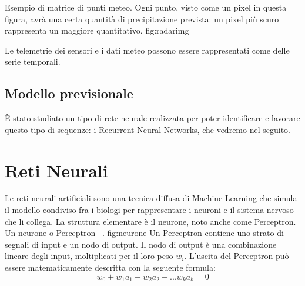 {Esempio di matrice di punti meteo. Ogni punto, visto come un pixel in questa figura, avrà una certa quantità di precipitazione prevista: un pixel più scuro rappresenta un maggiore quantitativo. }
{fig:radarimg}

Le telemetrie dei sensori e i dati meteo possono essere rappresentati come delle serie temporali.
\subsection{Modello previsionale}
È stato studiato un tipo di rete neurale realizzata per poter identificare e lavorare questo tipo di sequenze: i Recurrent Neural Networks, che vedremo nel seguito. 
\section{Reti Neurali}
Le reti neurali artificiali sono una tecnica diffusa di Machine Learning che simula il modello condiviso fra i biologi per rappresentare i neuroni e il sistema nervoso che li collega. La struttura elementare è il neurone, noto anche come Perceptron.
{Un neurone o Perceptron ~\cite{witten}.}
{fig:neurone}
Un Perceptron contiene uno strato di segnali di input e un nodo di output. Il nodo di output è una combinazione lineare degli input, moltiplicati per il loro peso $ w_{i} $. L’uscita del Perceptron può essere matematicamente descritta con la seguente formula:
\[ w_{0}+w_{1}a_{1}+w_{2}a_{2}+...w_{k}a_{k}=0 \]


